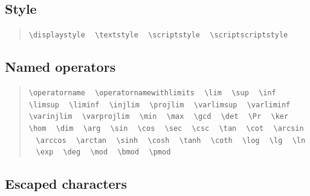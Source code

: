 \documentclass{article}
\newcommand{\texcommand}[1]{\textbackslash{}#1}
\newcommand{\spacer}{\,\,\, \hfil}
\newcommand{\lastspacer}{\hfill\hfill\hfill}
\newenvironment{mylist}{\begin{quote}}{\end{quote}}
\begin{document}
\subsection{Style}

\begin{mylist}
\texttt{\texcommand{displaystyle}} \spacer
\texttt{\texcommand{textstyle}} \spacer
\texttt{\texcommand{scriptstyle}} \spacer
\texttt{\texcommand{scriptscriptstyle}} \lastspacer
\end{mylist}

\subsection{Named operators}

\begin{mylist}
\texttt{\texcommand{operatorname}} \spacer
\texttt{\texcommand{operatornamewithlimits}} \spacer
\texttt{\texcommand{lim}} \spacer
\texttt{\texcommand{sup}} \spacer
\texttt{\texcommand{inf}} \spacer
\texttt{\texcommand{limsup}} \spacer
\texttt{\texcommand{liminf}} \spacer
\texttt{\texcommand{injlim}} \spacer
\texttt{\texcommand{projlim}} \spacer
\texttt{\texcommand{varlimsup}} \spacer
\texttt{\texcommand{varliminf}} \spacer
\texttt{\texcommand{varinjlim}} \spacer
\texttt{\texcommand{varprojlim}} \spacer
\texttt{\texcommand{min}} \spacer
\texttt{\texcommand{max}} \spacer
\texttt{\texcommand{gcd}} \spacer
\texttt{\texcommand{det}} \spacer
\texttt{\texcommand{Pr}} \spacer
\texttt{\texcommand{ker}} \spacer
\texttt{\texcommand{hom}} \spacer
\texttt{\texcommand{dim}} \spacer
\texttt{\texcommand{arg}} \spacer
\texttt{\texcommand{sin}} \spacer
\texttt{\texcommand{cos}} \spacer
\texttt{\texcommand{sec}} \spacer
\texttt{\texcommand{csc}} \spacer
\texttt{\texcommand{tan}} \spacer
\texttt{\texcommand{cot}} \spacer
\texttt{\texcommand{arcsin}} \spacer
\texttt{\texcommand{arccos}} \spacer
\texttt{\texcommand{arctan}} \spacer
\texttt{\texcommand{sinh}} \spacer
\texttt{\texcommand{cosh}} \spacer
\texttt{\texcommand{tanh}} \spacer
\texttt{\texcommand{coth}} \spacer
\texttt{\texcommand{log}} \spacer
\texttt{\texcommand{lg}} \spacer
\texttt{\texcommand{ln}} \spacer
\texttt{\texcommand{exp}} \spacer
\texttt{\texcommand{deg}} \spacer
\texttt{\texcommand{mod}} \spacer
\texttt{\texcommand{bmod}} \spacer
\texttt{\texcommand{pmod}} \lastspacer
\end{mylist}

\subsection{Escaped characters}
\end{document}
